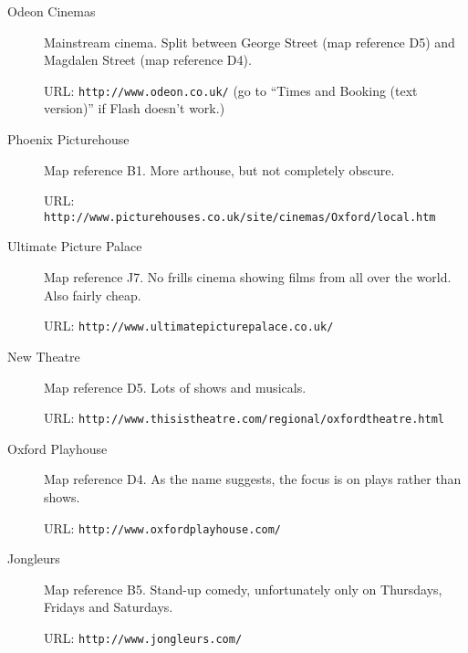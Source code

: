 \begin{description}

\item[Odeon Cinemas] Mainstream cinema.  Split between George Street (map reference D5) and Magdalen Street (map reference D4).  

URL: \verb+http://www.odeon.co.uk/+ (go to ``Times and Booking (text version)'' if Flash doesn't work.)

\item[Phoenix Picturehouse] Map reference B1.  More arthouse, but not completely obscure.  

URL: \verb+http://www.picturehouses.co.uk/site/cinemas/Oxford/local.htm+

\item[Ultimate Picture Palace] Map reference J7.  No frills cinema showing films from all over the world. Also fairly cheap.  

URL: \verb+http://www.ultimatepicturepalace.co.uk/+

\item[New Theatre] Map reference D5.  Lots of shows and musicals.  

URL: \verb+http://www.thisistheatre.com/regional/oxfordtheatre.html+


\item[Oxford Playhouse] Map reference D4.  As the name suggests, the focus is on plays rather than shows. 

URL: \verb+http://www.oxfordplayhouse.com/+

\item[Jongleurs]  Map reference B5.  Stand-up comedy, unfortunately only on Thursdays, Fridays and Saturdays.

URL: \verb+http://www.jongleurs.com/+


\end{description}



